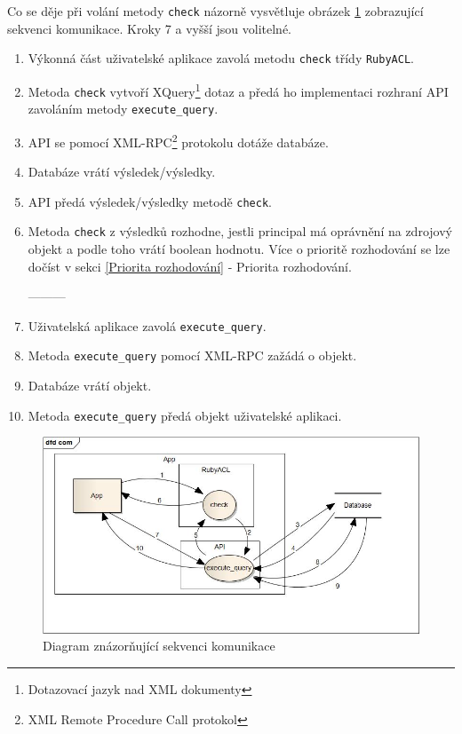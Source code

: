 Co se děje při volání metody \verb|check| názorně vysvětluje obrázek \ref{fig:Communication diagram} zobrazující sekvenci komunikace. Kroky 7 a vyšší jsou volitelné.
\begin{enumerate}
\item Výkonná část uživatelské aplikace zavolá metodu \verb|check| třídy \verb|RubyACL|.
\item Metoda \verb|check| vytvoří XQuery\footnote{Dotazovací jazyk nad XML dokumenty} dotaz a předá ho implementaci rozhraní API zavoláním metody \verb|execute_query|.
\item API se pomocí XML-RPC\footnote{XML Remote Procedure Call protokol} protokolu dotáže databáze.
\item Databáze vrátí výsledek/výsledky.
\item API předá výsledek/výsledky metodě \verb|check|.
\item Metoda \verb|check| z výsledků rozhodne, jestli principal má oprávnění na zdrojový objekt a podle toho vrátí boolean hodnotu. Více o prioritě rozhodování se lze dočíst v sekci \ref{Priorita rozhodování} - Priorita rozhodování.

---------

\item Uživatelská aplikace zavolá \verb|execute_query|.
\item Metoda \verb|execute_query| pomocí XML-RPC zažádá o objekt.
\item Databáze vrátí objekt.
\item Metoda \verb|execute_query| předá objekt uživatelské aplikaci.
\end{enumerate}

\begin{figure}
\includegraphics[width=15cm]{com.jpg}
\caption{Diagram znázorňující sekvenci komunikace}
\label{fig:Communication diagram}
\end{figure}

